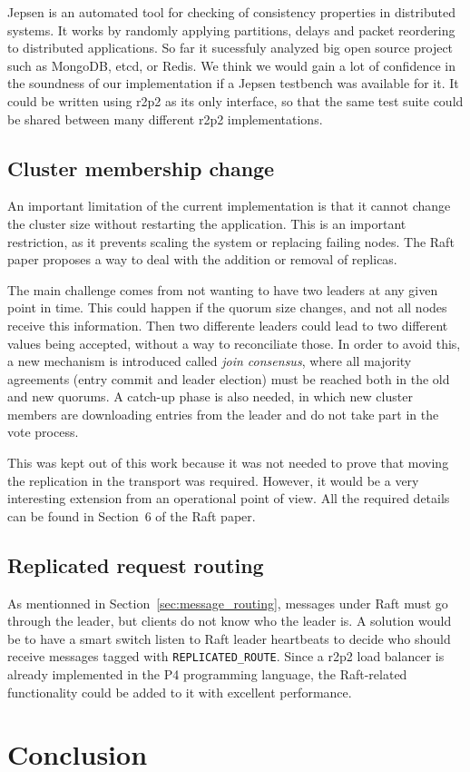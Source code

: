 Jepsen\cite{jepsen} is an automated tool for checking of consistency properties in distributed systems.
It works by randomly applying partitions, delays and packet reordering to distributed applications.
So far it sucessfuly analyzed big open source project such as MongoDB, etcd, or Redis.
We think we would gain a lot of confidence in the soundness of our implementation if a Jepsen testbench was available for it.
It could be written using \gls{r2p2} as its only interface, so that the same test suite could be shared between many different \gls{r2p2} implementations.


\section{Cluster membership change}

An important limitation of the current implementation is that it cannot change the cluster size without restarting the application.
This is an important restriction, as it prevents scaling the system or replacing failing nodes.
The Raft paper\cite{raft} proposes a way to deal with the addition or removal of replicas.

The main challenge comes from not wanting to have two leaders at any given point in time.
This could happen if the quorum size changes, and not all nodes receive this information.
Then two differente leaders could lead to two different values being accepted, without a way to reconciliate those.
In order to avoid this, a new mechanism is introduced called \emph{join consensus}, where all majority agreements (entry commit and leader election) must be reached both in the old and new quorums.
A catch-up phase is also needed, in which new cluster members are downloading entries from the leader and do not take part in the vote process.

This was kept out of this work because it was not needed to prove that moving the replication in the transport was required.
However, it would be a very interesting extension from an operational point of view.
All the required details can be found in Section~6 of the Raft paper\cite{raft}.


\section{Replicated request routing}

As mentionned in Section~\ref{sec:message_routing}, messages under Raft must go through the leader, but clients do not know who the leader is.
A solution would be to have a smart switch listen to Raft leader heartbeats to decide who should receive messages tagged with \texttt{REPLICATED\_ROUTE}.
Since a \gls{r2p2} load balancer is already implemented in the P4 programming language\cite{r2p2}, the Raft-related functionality could be added to it with excellent performance.


\chapter{Conclusion}

